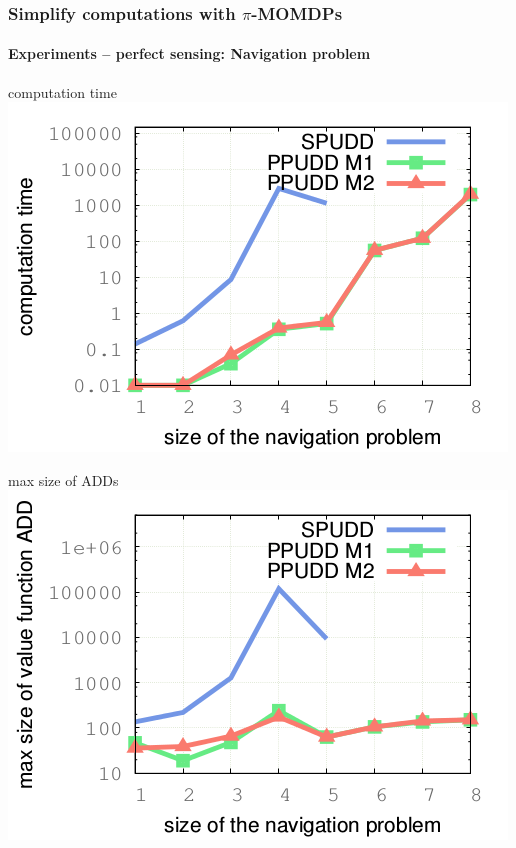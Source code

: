 \documentclass[12pt,svgnames,table]{beamer}
\begin{document}
\begin{frame}
\frametitle{Simplify computations with $\pi$-MOMDPs}
\framesubtitle{\footnotesize Experiments -- perfect sensing: Navigation problem}
\vspace{0.3cm}

\begin{minipage}{0.45\linewidth}
\centering
{\color{orange} computation time} \\
\includegraphics[scale=0.4]{courbeTime.png}\\
\end{minipage}
\hspace{0.6cm}
\begin{minipage}{0.45\linewidth}
{\hspace{0.7cm} \color{orange} max size of ADDs} \\
\includegraphics[scale=0.3]{courbeADD.png} \\

\end{minipage}
\end{frame}
\end{document}
